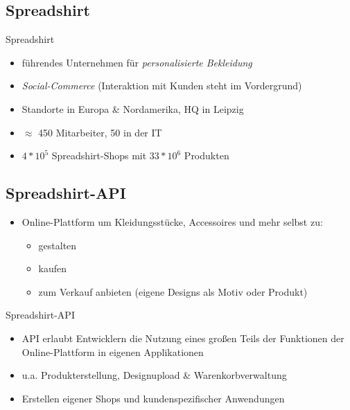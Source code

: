 \subsection{Spreadshirt}
\begin{frame}{Spreadshirt}
    \begin{itemize}
        \item führendes Unternehmen für \emph{personalisierte Bekleidung}
        \item \emph{Social-Commerce} (Interaktion mit Kunden steht im Vordergrund) %
        \item Standorte in Europa \& Nordamerika, HQ in Leipzig
        \item $\approx$ 450 Mitarbeiter, 50 in der IT
        \item $4*10^5$ Spreadshirt-Shops mit $33*10^6$ Produkten
    \end{itemize}
\end{frame}

\subsection{Spreadshirt-API}
\begin{frame}[squeeze]
    \begin{itemize}
        \item Online-Plattform um Kleidungsstücke, Accessoires und mehr selbst zu:
        \begin{itemize}
            \item gestalten
            \item kaufen
            \item zum Verkauf anbieten (eigene Designs als Motiv oder Produkt)
        \end{itemize}
    \end{itemize}

    \begin{block}{Spreadshirt-API}
        \begin{itemize}
            \item API erlaubt Entwicklern die Nutzung eines großen Teils der Funktionen der Online-Plattform in eigenen Applikationen
            \item u.a. Produkterstellung, Designupload \& Warenkorbverwaltung
            \item Erstellen eigener Shops und kundenspezifischer Anwendungen %
        \end{itemize}
    \end{block}
\end{frame}

